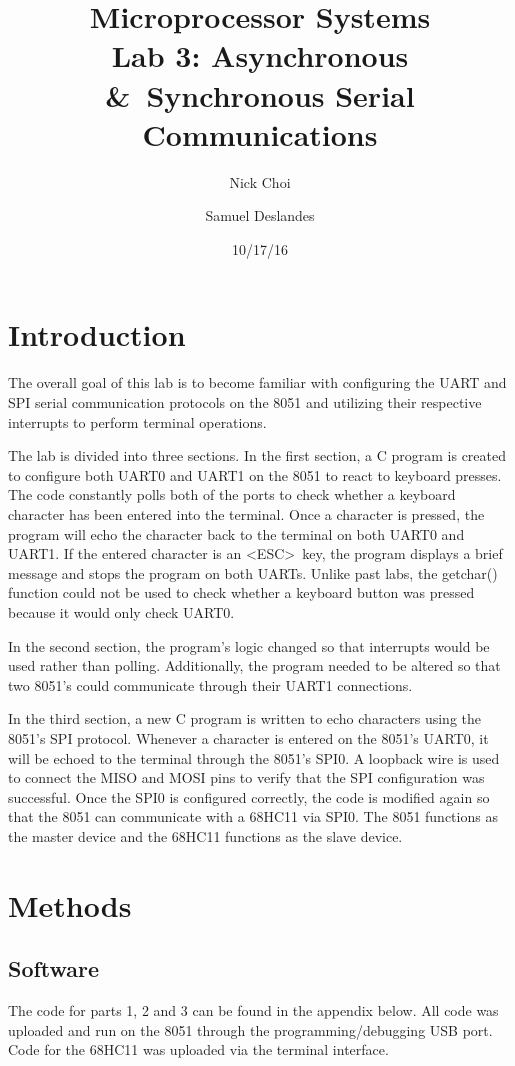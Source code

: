 \documentclass[12pt]{article}
\begin{document}
\title{Microprocessor Systems\\ Lab 3: Asynchronous \&\ Synchronous Serial Communications }
\author{Nick Choi \and Samuel Deslandes}
\date{10/17/16}
\maketitle
\pagebreak
\section{Introduction}

The overall goal of this lab is to become familiar with configuring the UART and SPI serial communication protocols on the 8051 and utilizing their respective interrupts to perform terminal operations. 

The lab is divided into three sections. In the first section, a C program is created to configure both UART0 and UART1 on the 8051 to react to keyboard presses. The code constantly polls both of the ports to check whether a keyboard character has been entered into the terminal. Once a character is pressed, the program will echo the character back to the terminal on both UART0 and UART1. If the entered character is an  \textless ESC\textgreater\ key, the program displays a brief message and stops the program on both UARTs. Unlike past labs, the getchar() function could not be used to check whether a keyboard button was pressed because it would only check UART0. 

In the second section, the program’s logic changed so that interrupts would be used rather than polling. Additionally, the program needed to be altered so that two 8051’s could communicate through their UART1 connections.

In the third section, a new C program is written to echo characters using the 8051\textquoteright s SPI protocol. Whenever a character is entered on the 8051’s UART0, it will be echoed to the terminal through the 8051\textquoteright s SPI0. A loopback wire is used to connect the MISO and MOSI pins to verify that the SPI configuration was successful. Once the SPI0 is configured correctly, the code is modified again so that the 8051 can communicate with a 68HC11 via SPI0. The 8051 functions as the master device and the 68HC11 functions as the slave device. 
\section{Methods}
\subsection{Software}
The code for parts 1, 2 and 3 can be found in the appendix below. All code was uploaded and run on the 8051 through the programming/debugging USB port. Code for the 68HC11 was uploaded via the terminal interface. 	
\end{document}
